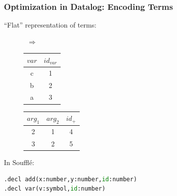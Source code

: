 \documentclass{beamer}
\begin{document}
\begin{frame}[fragile]
    \frametitle{Optimization in Datalog: Encoding Terms}
    ``Flat'' representation of terms:
    \begin{figure}
        \, $\Rightarrow$ \,%
        \begin{tabular}{ c c }
            $var$ & $id_{var}$ \\
            \hline
             c & 1 \\ 
             b & 2\\
             a & 3
        \end{tabular}
        \quad
        \begin{tabular}{ c c c }
        $arg_1$ & $arg_2$ & $id_+$ \\
        \hline
            2 & 1 & 4\\ 
            3 & 2 & 5
        \end{tabular}
    \end{figure} %
    \pause

    In Souffl\'e:
    \begin{lstlisting}[language=Python]
.decl add(x:number,y:number,id:number)
.decl var(v:symbol,id:number)
    \end{lstlisting}
\end{frame}
\end{document}
